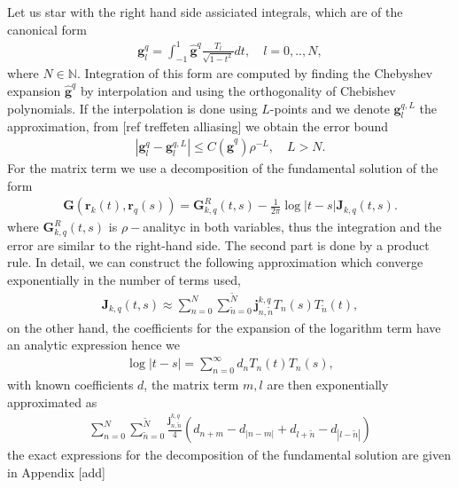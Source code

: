 \documentclass{article}
\newcommand{\todo}[1]{{\color{red}[#1]}}
\newcommand{\IN}{{\mathbb N}}
\begin{document}
Let us star with the right hand side assiciated integrals, which are of the canonical form 
\begin{align*}
\mathbf{g}^{q}_l = \int _{-1}^1 \widehat{\mathbf{g}}^q\frac{T_l}{\sqrt{1-t^2}}dt, \quad l=0,..,N,
\end{align*}
where $N \in \IN$. Integration of this form are computed by finding the Chebyshev expansion $\widehat{\mathbf{g}}^q$ by interpolation and using the orthogonality of Chebishev polynomials. If the interpolation is done using $L$-points and we denote $\mathbf{g}^{q,L}_l$ the approximation, from \todo{ref treffeten alliasing} we obtain the error bound 
\begin{align*}
|\mathbf{g}^{q}_l -\mathbf{g}^{q,L}_l| \leq C( \widehat{\mathbf{g}}^q) \rho^{-L}, \quad L> N.
\end{align*} 
For the matrix term we use a decomposition of the fundamental solution of the form
\begin{align}
\label{eq:gfdecomp}
\mathbf{G}(\mathbf{r}_k(t),
\mathbf{r}_q(s))  = \mathbf{G}^R_{k,q}(t,s) - \frac{1}{2\pi} \log |t-s| \mathbf{J}_{k,q}(t,s).
\end{align}
where $\mathbf{G}^R_{k,q}(t,s)$ is $\rho-$analityc in both variables, thus the integration and the error are similar to the right-hand side. The second part is done by a product rule. In detail, we can construct the following approximation which converge exponentially in the number of terms used, 
\begin{align*}
\mathbf{J}_{k,q}(t,s) \approx \sum_{n=0}^N\sum_{\widetilde{n}=0}^{\widetilde{N}} \mathbf{j}^{k,q}_{n,\widetilde{n}} T_n(s) T_{\widetilde{n}}(t),
\end{align*}
on the other hand, the  coefficients for the expansion of the logarithm term have an analytic expression hence we 
\begin{align*}
\log |t-s|  = \sum_{n=0}^\infty d_n T_n(t) T_n(s),
\end{align*}
with known coefficients $d$, the matrix term $m,l$ are then exponentially approximated as 
\begin{align*}
\sum_{n=0}^N\sum_{\widetilde{n}=0}^{\widetilde{N}} \frac{\mathbf{j}^{k,q}_{n,\widetilde{n}}}{4}(d_{n+m} - d_{|n-m|}+d_{l+\widetilde{n}}-d_{|l-\widetilde{n}|})
\end{align*}
the exact expressions for the decomposition of the fundamental solution are given in Appendix \todo{add}
\end{document}
